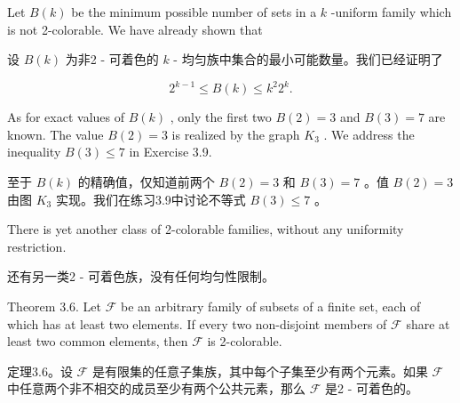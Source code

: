 \documentclass[10pt]{article}
\begin{document}
Let \(B\left( k\right)\) be the minimum possible number of sets in a \(k\) -uniform family which is not 2-colorable. We have already shown that

\begin{tcolorbox}\relax
设 \(B\left( k\right)\) 为非2 - 可着色的 \(k\) - 均匀族中集合的最小可能数量。我们已经证明了
\end{tcolorbox}

\[
{2}^{k - 1} \leq  B\left( k\right)  \leq  {k}^{2}{2}^{k}.
\]

As for exact values of \(B\left( k\right)\) , only the first two \(B\left( 2\right)  = 3\) and \(B\left( 3\right)  = 7\) are known. The value \(B\left( 2\right)  = 3\) is realized by the graph \({K}_{3}\) . We address the inequality \(B\left( 3\right)  \leq  7\) in Exercise 3.9.

\begin{tcolorbox}\relax
至于 \(B\left( k\right)\) 的精确值，仅知道前两个 \(B\left( 2\right)  = 3\) 和 \(B\left( 3\right)  = 7\) 。值 \(B\left( 2\right)  = 3\) 由图 \({K}_{3}\) 实现。我们在练习3.9中讨论不等式 \(B\left( 3\right)  \leq  7\) 。
\end{tcolorbox}

There is yet another class of 2-colorable families, without any uniformity restriction.

\begin{tcolorbox}\relax
还有另一类2 - 可着色族，没有任何均匀性限制。
\end{tcolorbox}

Theorem 3.6. Let \(\mathcal{F}\) be an arbitrary family of subsets of a finite set, each of which has at least two elements. If every two non-disjoint members of \(\mathcal{F}\) share at least two common elements, then \(\mathcal{F}\) is 2-colorable.

\begin{tcolorbox}\relax
定理3.6。设 \(\mathcal{F}\) 是有限集的任意子集族，其中每个子集至少有两个元素。如果 \(\mathcal{F}\) 中任意两个非不相交的成员至少有两个公共元素，那么 \(\mathcal{F}\) 是2 - 可着色的。
\end{tcolorbox}
\end{document}
